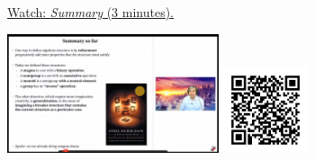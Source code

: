 
\begin{minipage}{10cm}
    \href{https://act4e-spring21.netlify.app/videos/spring2021-semi-mon-gro:summary.html}{Watch: \emph{Summary} (3 minutes).}
        
    \href{https://act4e-spring21.netlify.app/videos/spring2021-semi-mon-gro:summary.html}{\includegraphics[height=3.5cm]{spring2021-semi-mon-gro:summary/thumbnails.jpg}}
    \href{https://act4e-spring21.netlify.app/videos/spring2021-semi-mon-gro:summary.html}{\includegraphics[height=2.5cm]{spring2021-semi-mon-gro:summary/qrcode.png}}
\end{minipage}

